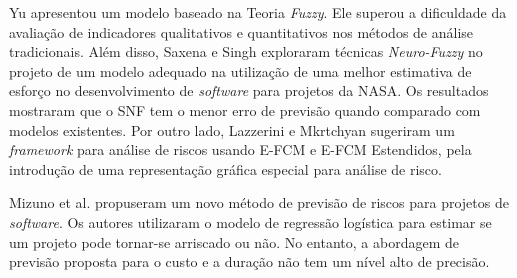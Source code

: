 Yu \cite{yu2011software} apresentou um modelo baseado na Teoria \textit{Fuzzy}. Ele superou a dificuldade da avaliação de indicadores qualitativos e quantitativos nos métodos de análise tradicionais. Além disso, Saxena e Singh \cite{saxena2012software} exploraram técnicas \textit{Neuro-Fuzzy} no projeto de um modelo adequado na utilização de uma melhor estimativa de esforço no desenvolvimento de \textit{software} para projetos da NASA. Os resultados mostraram que o SNF tem o menor erro de previsão quando comparado com modelos existentes. Por outro lado, Lazzerini e Mkrtchyan \cite{lazzerini2011analyzing} sugeriram um \textit{framework} para análise de riscos usando E-FCM e E-FCM Estendidos, pela introdução de uma representação gráfica especial para análise de risco.

Mizuno et al. \cite{mizuno2001prediction} propuseram um novo método de previsão de riscos para projetos de \textit{software}. Os autores utilizaram o modelo de regressão logística para estimar se um projeto pode tornar-se arriscado ou não. No entanto, a abordagem de previsão proposta para o custo e a duração não tem um nível alto de precisão. 

